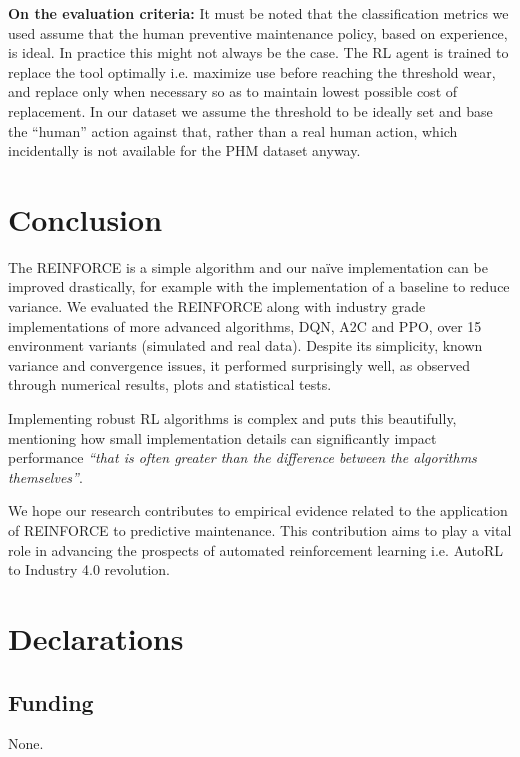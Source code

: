 \documentclass[referee, sn-mathphys-num]{sn-jnl}
\begin{document}
	\textbf{On the evaluation criteria:} It must be noted that the classification metrics we used assume that the human preventive maintenance policy, based on experience, is ideal. In practice this might not always be the case. The RL agent is trained to replace the tool optimally i.e. maximize use before reaching the threshold wear, and replace only when necessary so as to maintain lowest possible cost of replacement. In our dataset we assume the threshold to be ideally set and base the ``human'' action against that, rather than a real human action, which incidentally is not available for the PHM dataset anyway.
	
	\section{Conclusion}\label{sec_Conclusion}
	The REINFORCE is a simple algorithm and our na\"ive implementation can be improved drastically, for example with the implementation of a baseline to reduce variance. We evaluated the REINFORCE along with industry grade implementations of more advanced algorithms, DQN, A2C and PPO, over 15 environment variants (simulated and real data). Despite its simplicity, known variance and convergence issues, it performed surprisingly well, as observed through numerical results, plots and statistical tests. 
	
	Implementing robust RL algorithms is complex and \cite{SB3-paper} puts this beautifully, mentioning how small implementation details can significantly impact performance \textit{``that is often greater than the difference between the algorithms themselves''}. 
	
	We hope our research contributes to empirical evidence related to the application of REINFORCE to predictive maintenance. This contribution aims to play a vital role in advancing the prospects of automated reinforcement learning i.e. AutoRL to Industry 4.0 revolution.
	
	\backmatter
	
	
	
	\section*{Declarations}
	
	\subsection*{Funding}
	None.
\end{document}
